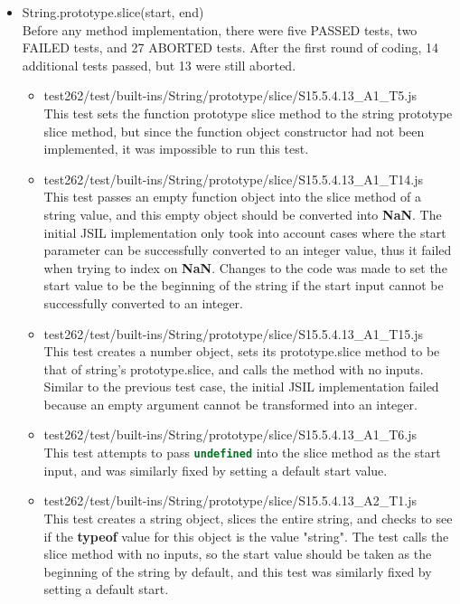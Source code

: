 \documentclass[a4paper,11pt,twoside]{report}
\def\jsinline{\lstinline[language=JavaScript, basicstyle=\small]}%\end{lstlisting}
\begin{document}
\begin{itemize}
\item String.prototype.slice(start, end) \\
Before any method implementation, there were five PASSED tests, two FAILED tests, and 27 ABORTED tests. After the first round of coding, 14 additional tests passed, but 13 were still aborted. 
\begin{itemize}
\item test262/test/built-ins/String/prototype/slice/S15.5.4.13\_A1\_T5.js \\
This test sets the function prototype slice method to the string prototype slice method, but since the function object constructor had not been implemented, it was impossible to run this test.
\item test262/test/built-ins/String/prototype/slice/S15.5.4.13\_A1\_T14.js \\
This test passes an empty function object into the slice method of a string value, and this empty object should be converted into \textbf{NaN}. The initial JSIL implementation only took into account cases where the start parameter can be successfully converted to an integer value, thus it failed when trying to index on \textbf{NaN}. Changes to the code was made to set the start value to be the beginning of the string if the start input cannot be successfully converted to an integer.
\item test262/test/built-ins/String/prototype/slice/S15.5.4.13\_A1\_T15.js \\
This test creates a number object, sets its prototype.slice method to be that of string's prototype.slice, and calls the method with no inputs. Similar to the previous test case, the initial JSIL implementation failed because an empty argument cannot be transformed into an integer.
\item test262/test/built-ins/String/prototype/slice/S15.5.4.13\_A1\_T6.js \\
This test attempts to pass \jsinline|undefined| into the slice method as the start input, and was similarly fixed by setting a default start value.
\item test262/test/built-ins/String/prototype/slice/S15.5.4.13\_A2\_T1.js \\
This test creates a string object, slices the entire string, and checks to see if the \textbf{typeof} value for this object is the value "string". The test calls the slice method with no inputs, so the start value should be taken as the beginning of the string by default, and this test was similarly fixed by setting a default start.
\end{itemize}


\end{itemize}
\end{document}
